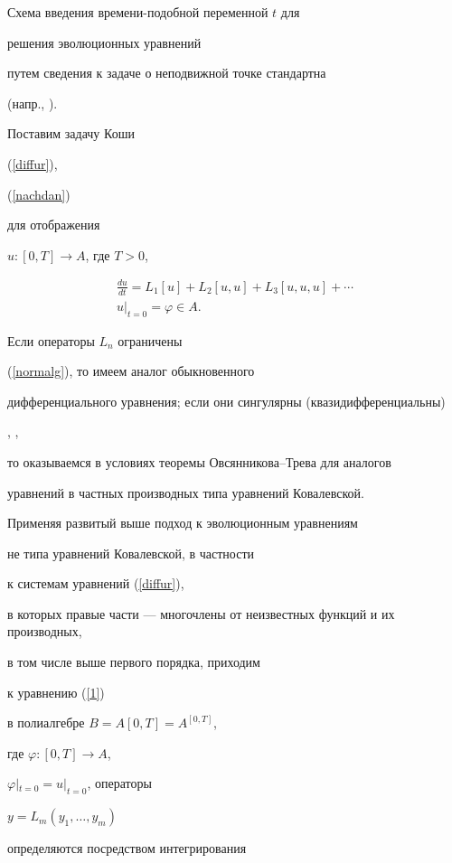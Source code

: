 Схема введения времени-подобной переменной $t$ для


решения эволюционных уравнений


путем сведения к задаче о неподвижной точке стандартна


(напр., \cite{Walter}).


Поставим задачу Коши


(\ref{diffur}),


(\ref{nachdan})


для отображения


$u:[0,T]\rightarrow A$, где $T>0$,


\begin{gather}


\label{diffur}


\frac{d u}{d t}=L_1[u]+L_2[u,u]+L_3[u,u,u]+\dotsb \\


%


\label{nachdan}


u|_{t=0}=\varphi\in A.


\end{gather}


Если операторы $L_n$ ограничены


(\ref{normalg}), то имеем аналог обыкновенного


дифференциального уравнения; если они сингулярны (квазидифференциальны)


\cite{8}, \cite{9},


то оказываемся в условиях теоремы Овсянникова--Трева для аналогов


уравнений в частных производных типа уравнений Ковалевской.


Применяя развитый выше подход к эволюционным уравнениям


не типа уравнений Ковалевской, в частности


к системам уравнений (\ref{diffur}),


в которых правые части --- многочлены от неизвестных функций и их производных,


в том числе выше первого порядка, приходим


к уравнению (\ref{1})


в полиалгебре $B=A[0,T]=A^{[0,T]}$,


где $\varphi:[0,T]\rightarrow A$,


$\varphi|_{t=0}=u|_{t=0}$, операторы


$y=L_m(y_1,\dotsc ,y_m)$


определяются посредством интегрирования


